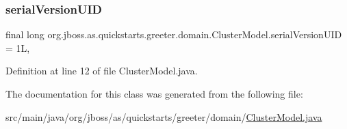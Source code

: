 \subsubsection{\texorpdfstring{serial\+Version\+U\+ID}{serialVersionUID}}
{\footnotesize\ttfamily final long org.\+jboss.\+as.\+quickstarts.\+greeter.\+domain.\+Cluster\+Model.\+serial\+Version\+U\+ID = 1L\hspace{0.3cm}{\ttfamily [static]}, {\ttfamily [private]}}



Definition at line 12 of file Cluster\+Model.\+java.



The documentation for this class was generated from the following file\+:\begin{DoxyCompactItemize}
\item 
src/main/java/org/jboss/as/quickstarts/greeter/domain/\hyperlink{_cluster_model_8java}{Cluster\+Model.\+java}\end{DoxyCompactItemize}
